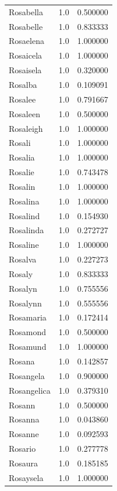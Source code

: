\documentclass[
  letterpaper,
  DIV=11,
  numbers=noendperiod]{scrreprt}
\begin{document}
\begin{tabular}{lrr}
Rosabella       &   1.0 &   0.500000 \\
Rosabelle       &   1.0 &   0.833333 \\
Rosaelena       &   1.0 &   1.000000 \\
Rosaicela       &   1.0 &   1.000000 \\
Rosaisela       &   1.0 &   0.320000 \\
Rosalba         &   1.0 &   0.109091 \\
Rosalee         &   1.0 &   0.791667 \\
Rosaleen        &   1.0 &   0.500000 \\
Rosaleigh       &   1.0 &   1.000000 \\
Rosali          &   1.0 &   1.000000 \\
Rosalia         &   1.0 &   1.000000 \\
Rosalie         &   1.0 &   0.743478 \\
Rosalin         &   1.0 &   1.000000 \\
Rosalina        &   1.0 &   1.000000 \\
Rosalind        &   1.0 &   0.154930 \\
Rosalinda       &   1.0 &   0.272727 \\
Rosaline        &   1.0 &   1.000000 \\
Rosalva         &   1.0 &   0.227273 \\
Rosaly          &   1.0 &   0.833333 \\
Rosalyn         &   1.0 &   0.755556 \\
Rosalynn        &   1.0 &   0.555556 \\
Rosamaria       &   1.0 &   0.172414 \\
Rosamond        &   1.0 &   0.500000 \\
Rosamund        &   1.0 &   1.000000 \\
Rosana          &   1.0 &   0.142857 \\
Rosangela       &   1.0 &   0.900000 \\
Rosangelica     &   1.0 &   0.379310 \\
Rosann          &   1.0 &   0.500000 \\
Rosanna         &   1.0 &   0.043860 \\
Rosanne         &   1.0 &   0.092593 \\
Rosario         &   1.0 &   0.277778 \\
Rosaura         &   1.0 &   0.185185 \\
Rosaysela       &   1.0 &   1.000000 \\

\end{tabular}
\end{document}
